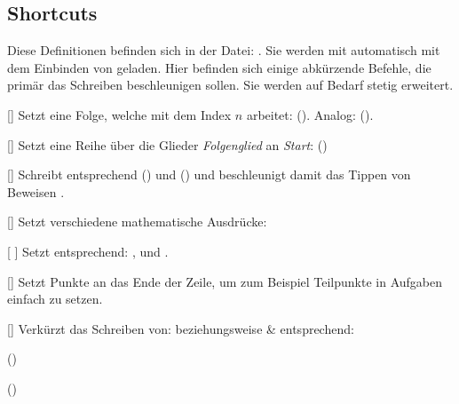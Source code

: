 \subsection[Shortcuts \LILLYxBOXxVersion{\small 1.0.8}]{Shortcuts}
Diese Definitionen befinden sich in der Datei: . Sie werden mit  automatisch mit dem Einbinden von  geladen.\medskip\newline
Hier befinden sich einige abkürzende Befehle, die primär das Schreiben beschleunigen sollen. Sie werden auf Bedarf stetig erweitert.

%
%
%

[\cmdlist{}]
Setzt eine Folge, welche mit dem Index $n$ arbeitet:  (\folge). Analog:  (\folgek).

%
%
%

[]
Setzt eine Reihe über die Glieder \emph{Folgenglied} an \emph{Start}:  (\reihe)

%
%
%

[\cmdlist {}]
Schreibt entsprechend  () und  () und beschleunigt damit das Tippen von Beweisen \Smiley.

%
%
%

[\cmdlist {}\cmdlist {}\cmdlist {}\cmdlist {}]
Setzt verschiedene mathematische Ausdrücke:

%
%
%

[\cmdlist {}\cmdlist {} \cmdold]
Setzt entsprechend: \x[], \y und \z[].

%
%
%

[]
Setzt Punkte an das Ende der Zeile, um zum Beispiel Teilpunkte in Aufgaben einfach zu setzen.

%
%
%

[\cmdlist {}]
Verkürzt das Schreiben von:  beziehungsweise  \&  entsprechend:
\begin{multicols}{2}%
    \begin{ditemize}
        \item {} ()%
        \item {} ()%
    \end{ditemize}
\end{multicols}


